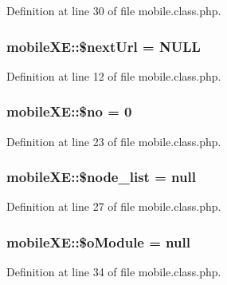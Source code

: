 Definition at line 30 of file mobile.\-class.\-php.

\hypertarget{classmobileXE_adbdb5909b975bb776f91817d2392aaca}{
\subsubsection[{\$next\-Url}]{\setlength{\rightskip}{0pt plus 5cm}mobile\-X\-E\-::\$next\-Url = N\-U\-L\-L}}\label{classmobileXE_adbdb5909b975bb776f91817d2392aaca}


Definition at line 12 of file mobile.\-class.\-php.

\hypertarget{classmobileXE_a497e828014cdb6eaef56dd42d0f816e6}{
\subsubsection[{\$no}]{\setlength{\rightskip}{0pt plus 5cm}mobile\-X\-E\-::\$no = 0}}\label{classmobileXE_a497e828014cdb6eaef56dd42d0f816e6}


Definition at line 23 of file mobile.\-class.\-php.

\hypertarget{classmobileXE_af906479c52f412d0beae2252bad4ef35}{
\subsubsection[{\$node\-\_\-list}]{\setlength{\rightskip}{0pt plus 5cm}mobile\-X\-E\-::\$node\-\_\-list = null}}\label{classmobileXE_af906479c52f412d0beae2252bad4ef35}


Definition at line 27 of file mobile.\-class.\-php.

\hypertarget{classmobileXE_a64908b5e1d46537b4739036b1a00b689}{
\subsubsection[{\$o\-Module}]{\setlength{\rightskip}{0pt plus 5cm}mobile\-X\-E\-::\$o\-Module = null}}\label{classmobileXE_a64908b5e1d46537b4739036b1a00b689}


Definition at line 34 of file mobile.\-class.\-php.

